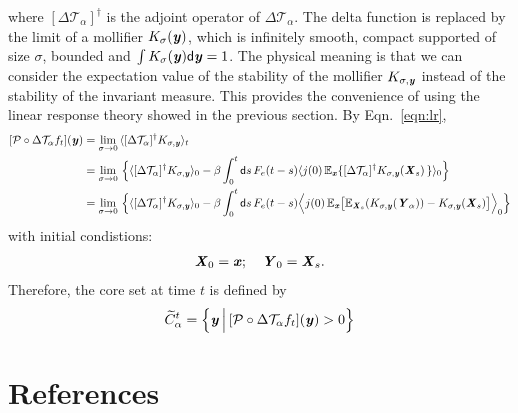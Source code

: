 \documentclass[aip,jcp,a4paper,reprint,onecolumn]{revtex4-1}
\newcommand{\vect}[1]{\textbf{\textit{#1}}}
\newcommand{\dd}{\textsf{d}}
\newcommand{\mt}{\mathcal T}
\begin{document}
where $[\Delta \mt_\alpha]^\dagger$ is the adjoint operator of $\Delta
\mt_\alpha$. The delta
function is replaced by the limit of a mollifier $K_\sigma(\vect y)$,
which is infinitely smooth, compact supported of size $\sigma$,
bounded and $\int
K_\sigma(\vect y)\dd \vect y = 1$.  The physical meaning is that we
can consider the expectation value of the stability of the mollifier
$K_{\sigma, \vect y}$ instead of the stability of the invariant measure.
This provides the convenience of using the linear response theory showed
in the previous section. By Eqn.~\eqref{eqn:lr},
\begin{align}\nonumber
  [\mathcal P\circ\Delta \mt_\alpha f_t](\vect y)
  &=
  \lim_{\sigma \rightarrow 0}\,
  \langle
  [\Delta \mt_\alpha]^\dagger K_{\sigma, \vect y}
  \rangle_t \\\nonumber
  &=
  \lim_{\sigma \rightarrow 0}\,
  \Big\{
  \langle
  [\Delta \mt_\alpha]^\dagger K_{\sigma, \vect y}
  \rangle_0  -
  \beta
  \int_0^t\dd s\,
  F_e(t-s)
  \langle
  j(0)\,
  \mathbb E_{\vect x}\{
  [\Delta \mt_\alpha]^\dagger K_{\sigma, \vect y}(\vect X_s)\,
  \}
  \rangle_0
  \Big\} \\
  &=
  \lim_{\sigma \rightarrow 0}\,
  \Big\{
  \langle
  [\Delta \mt_\alpha]^\dagger K_{\sigma, \vect y}
  \rangle_0  -
  \beta
  \int_0^t\dd s\,
  F_e(t-s)
  \Big\langle
  j(0)\,
  \mathbb E_{\vect x}
  \big[
  \mathbb E_{\vect X_s}
  (K_{\sigma, \vect y}(\vect Y_\alpha))
  -
  K_{\sigma, \vect y}(\vect X_s)
  \big]
  \Big\rangle_0
  \Big\}
\end{align}
with initial condistions:
\begin{align}
  \vect X_0 = \vect x; \quad \vect Y_0 = \vect X_s.
\end{align}
Therefore, the core set at time $t$ is defined by
\begin{align}
  \widetilde C_\alpha^t =
  \Big\{
  \vect y
  \,\Big\vert\,
  [\mathcal P\circ\Delta \mt_\alpha f_t](\vect y) > 0
  \Big\}
\end{align}


\section*{References}
{}

\end{document}
